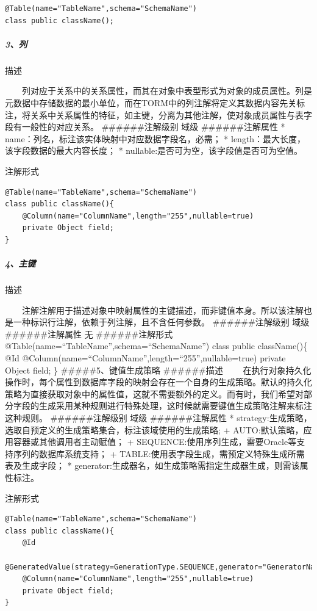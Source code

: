 \documentclass[]{article}
\begin{document}
\begin{verbatim}
@Table(name="TableName",schema="SchemaName")
class public className();
\end{verbatim}

\subparagraph{3、列}\label{ux5217}

描述

　　列对应于关系中的关系属性，而其在对象中表型形式为对象的成员属性。列是元数据中存储数据的最小单位，而在TORM中的列注解将定义其数据内容先关标注，将关系中关系属性的特征，如主键，分离为其他注解，使对象成员属性与表字段有一般性的对应关系。
\#\#\#\#\#\#注解级别 域级 \#\#\#\#\#\#注解属性 *
name：列名，标注该实体映射中对应数据字段名，必需； *
length：最大长度，该字段数据的最大内容长度； *
nullable:是否可为空，该字段值是否可为空值。

注解形式

\begin{verbatim}
@Table(name="TableName",schema="SchemaName")
class public className(){
    @Column(name="ColumnName",length="255",nullable=true)
    private Object field;
}
\end{verbatim}

\subparagraph{4、主键}\label{ux4e3bux952e}

描述

　　注解注解用于描述对象中映射属性的主键描述，而非键值本身。所以该注解也是一种标识行注解，依赖于列注解，且不含任何参数。
\#\#\#\#\#\#注解级别 域级 \#\#\#\#\#\#注解属性 无 \#\#\#\#\#\#注解形式
@Table(name=``TableName'',schema=``SchemaName'') class public
className()\{ @Id
@Column(name=``ColumnName'',length=``255'',nullable=true) private Object
field; \} \#\#\#\#\#5、键值生成策略 \#\#\#\#\#\#描述
　　在执行对象持久化操作时，每个属性到数据库字段的映射会存在一个自身的生成策略。默认的持久化策略为直接获取对象中的属性值，这就不需要额外的定义。而有时，我们希望对部分字段的生成采用某种规则进行特殊处理，这时候就需要键值生成策略注解来标注这种规则。
\#\#\#\#\#\#注解级别 域级 \#\#\#\#\#\#注解属性 *
strategy:生成策略，选取自预定义的生成策略集合，标注该域使用的生成策略; +
AUTO:默认策略，应用容器或其他调用者主动赋值； +
SEQUENCE:使用序列生成，需要Oracle等支持序列的数据库系统支持； +
TABLE:使用表字段生成，需预定义特殊生成所需表及生成字段； *
generator:生成器名，如生成策略需指定生成器生成，则需该属性标注。

注解形式

\begin{verbatim}
@Table(name="TableName",schema="SchemaName")
class public className(){
    @Id     
    @GeneratedValue(strategy=GenerationType.SEQUENCE,generator="GeneratorName")
    @Column(name="ColumnName",length="255",nullable=true)
    private Object field;
}
\end{verbatim}
\end{document}
